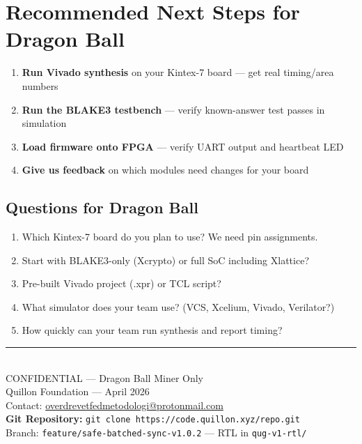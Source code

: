 \documentclass[11pt,a4paper]{article}
\begin{document}
\section{Recommended Next Steps for Dragon Ball}

\begin{enumerate}[leftmargin=1.5em]
    \item \textbf{Run Vivado synthesis} on your Kintex-7 board --- get real timing/area numbers
    \item \textbf{Run the BLAKE3 testbench} --- verify known-answer test passes in simulation
    \item \textbf{Load firmware onto FPGA} --- verify UART output and heartbeat LED
    \item \textbf{Give us feedback} on which modules need changes for your board
\end{enumerate}

\subsection{Questions for Dragon Ball}

\begin{enumerate}[leftmargin=1.5em]
    \item Which Kintex-7 board do you plan to use? We need pin assignments.
    \item Start with BLAKE3-only (Xcrypto) or full SoC including Xlattice?
    \item Pre-built Vivado project (.xpr) or TCL script?
    \item What simulator does your team use? (VCS, Xcelium, Vivado, Verilator?)
    \item How quickly can your team run synthesis and report timing?
\end{enumerate}

\vspace{1.5em}

\begin{center}
\textcolor{qnkpurple}{\rule{0.5\textwidth}{1.5pt}}\\[8pt]
{\small\textcolor{qnkslate}{CONFIDENTIAL --- Dragon Ball Miner Only}}\\[4pt]
{\small\textcolor{qnkslate}{Quillon Foundation --- April 2026}}\\[4pt]
{\small\textcolor{qnkslate}{Contact: \href{mailto:overdrevetfedmetodologi@protonmail.com}{overdrevetfedmetodologi@protonmail.com}}}\\[8pt]
{\small\textcolor{qnkblue}{\textbf{Git Repository:} \texttt{git clone https://code.quillon.xyz/repo.git}}}\\[2pt]
{\small\textcolor{qnkslate}{Branch: \texttt{feature/safe-batched-sync-v1.0.2} --- RTL in \texttt{qug-v1-rtl/}}}
\end{center}
\end{document}
